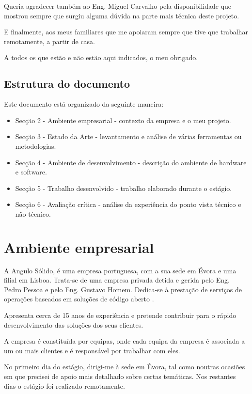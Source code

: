 \documentclass{article}
\begin{document}
Queria agradecer também ao Eng. Miguel Carvalho pela disponibilidade que mostrou sempre que surgiu alguma dúvida na parte mais técnica deste projeto.

E finalmente, aos meus familiares que me apoiaram sempre que tive que trabalhar remotamente, a partir de casa. 

A todos os que estão e não estão aqui indicados, o meu obrigado.

\subsection{Estrutura do documento}
Este documento está organizado da seguinte maneira:
\begin{itemize}
	\item Secção 2 - Ambiente empresarial - contexto da empresa e o meu projeto.
	\item Secção 3 - Estado da Arte - levantamento e análise de várias ferramentas ou metodologias.
	\item Secção 4 - Ambiente de desenvolvimento - descrição do ambiente de hardware e software.
	\item Secção 5 - Trabalho desenvolvido - trabalho elaborado durante o estágio.
	\item Secção 6 - Avaliação crítica - análise da experiência do ponto vista técnico e não técnico.
\end{itemize}

\cleardoublepage
\section{Ambiente empresarial}
A Angulo Sólido, é uma empresa portuguesa, com a sua sede em Évora e uma filial em Lisboa. Trata-se de uma empresa privada detida e gerida pelo Eng. Pedro Pessoa e pelo Eng. Gustavo Homem. Dedica-se à prestação de serviços de operações baseados em soluções de código aberto \cite{opensource}.

Apresenta cerca de 15 anos de experiência e pretende contribuir para o rápido desenvolvimento das soluções dos seus clientes.

A empresa é constituída por equipas, onde cada equipa da empresa é associada a um ou mais clientes e é responsável por trabalhar com eles.

No primeiro dia do estágio, dirigi-me à sede em Évora, tal como noutras ocasiões em que precisei de apoio mais detalhado sobre certas temáticas. Nos restantes dias o estágio foi realizado remotamente.
\end{document}
